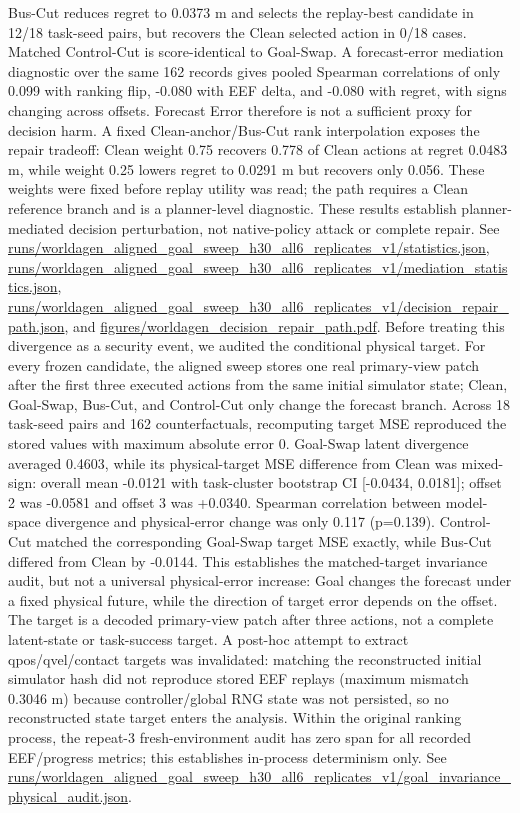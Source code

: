 \documentclass[10pt]{article}
\begin{document}
Bus-Cut reduces regret to 0.0373 m and selects the replay-best candidate in 12/18 task-seed pairs, but recovers the Clean selected action in 0/18 cases. Matched Control-Cut is score-identical to Goal-Swap. A forecast-error mediation diagnostic over the same 162 records gives pooled Spearman correlations of only 0.099 with ranking flip, -0.080 with EEF delta, and -0.080 with regret, with signs changing across offsets. Forecast Error therefore is not a sufficient proxy for decision harm. A fixed Clean-anchor/Bus-Cut rank interpolation exposes the repair tradeoff: Clean weight 0.75 recovers 0.778 of Clean actions at regret 0.0483 m, while weight 0.25 lowers regret to 0.0291 m but recovers only 0.056. These weights were fixed before replay utility was read; the path requires a Clean reference branch and is a planner-level diagnostic. These results establish planner-mediated decision perturbation, not native-policy attack or complete repair. See \url{runs/worldagen_aligned_goal_sweep_h30_all6_replicates_v1/statistics.json}, \url{runs/worldagen_aligned_goal_sweep_h30_all6_replicates_v1/mediation_statistics.json}, \url{runs/worldagen_aligned_goal_sweep_h30_all6_replicates_v1/decision_repair_path.json}, and \url{figures/worldagen_decision_repair_path.pdf}.
Before treating this divergence as a security event, we audited the conditional physical target. For every frozen candidate, the aligned sweep stores one real primary-view patch after the first three executed actions from the same initial simulator state; Clean, Goal-Swap, Bus-Cut, and Control-Cut only change the forecast branch. Across 18 task-seed pairs and 162 counterfactuals, recomputing target MSE reproduced the stored values with maximum absolute error 0. Goal-Swap latent divergence averaged 0.4603, while its physical-target MSE difference from Clean was mixed-sign: overall mean -0.0121 with task-cluster bootstrap CI [-0.0434, 0.0181]; offset 2 was -0.0581 and offset 3 was +0.0340. Spearman correlation between model-space divergence and physical-error change was only 0.117 (p=0.139). Control-Cut matched the corresponding Goal-Swap target MSE exactly, while Bus-Cut differed from Clean by -0.0144. This establishes the matched-target invariance audit, but not a universal physical-error increase: Goal changes the forecast under a fixed physical future, while the direction of target error depends on the offset. The target is a decoded primary-view patch after three actions, not a complete latent-state or task-success target. A post-hoc attempt to extract qpos/qvel/contact targets was invalidated: matching the reconstructed initial simulator hash did not reproduce stored EEF replays (maximum mismatch 0.3046 m) because controller/global RNG state was not persisted, so no reconstructed state target enters the analysis. Within the original ranking process, the repeat-3 fresh-environment audit has zero span for all recorded EEF/progress metrics; this establishes in-process determinism only. See \url{runs/worldagen_aligned_goal_sweep_h30_all6_replicates_v1/goal_invariance_physical_audit.json}.
\end{document}
